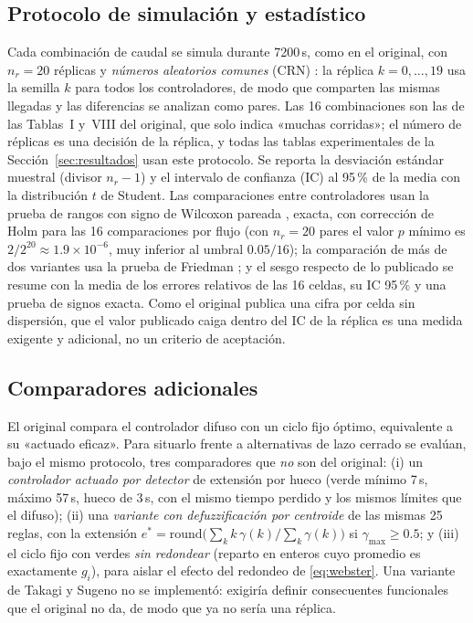 \documentclass[journal]{IEEEtran}
\begin{document}
\subsection{Protocolo de simulación y estadístico}
\label{sec:protocolo}
Cada combinación de caudal se simula durante 7200\,s, como en el original, con $n_r=20$ réplicas y \emph{números aleatorios comunes} (CRN) \cite{Law2015}: la réplica $k=0,\dots,19$ usa la semilla $k$ para todos los controladores, de modo que comparten las mismas llegadas y las diferencias se analizan como pares. Las 16 combinaciones son las de las Tablas~I y~VIII del original, que solo indica «muchas corridas»; el número de réplicas es una decisión de la réplica, y todas las tablas experimentales de la Sección~\ref{sec:resultados} usan este protocolo. Se reporta la desviación estándar muestral (divisor $n_r-1$) y el intervalo de confianza (IC) al 95\,\% de la media con la distribución $t$ de Student. Las comparaciones entre controladores usan la prueba de rangos con signo de Wilcoxon pareada \cite{Wilcoxon1945}, exacta, con corrección de Holm \cite{Holm1979} para las 16 comparaciones por flujo (con $n_r=20$ pares el valor $p$ mínimo es $2/2^{20}\approx1.9\times10^{-6}$, muy inferior al umbral $0.05/16$); la comparación de más de dos variantes usa la prueba de Friedman \cite{Friedman1937}; y el sesgo respecto de lo publicado se resume con la media de los errores relativos de las 16 celdas, su IC 95\,\% y una prueba de signos exacta. Como el original publica una cifra por celda sin dispersión, que el valor publicado caiga dentro del IC de la réplica es una medida exigente y adicional, no un criterio de aceptación.

\subsection{Comparadores adicionales}
\label{sec:comparadores}
El original compara el controlador difuso con un ciclo fijo óptimo, equivalente a su «actuado eficaz». Para situarlo frente a alternativas de lazo cerrado se evalúan, bajo el mismo protocolo, tres comparadores que \emph{no} son del original: (i) un \emph{controlador actuado por detector} de extensión por hueco (verde mínimo 7\,s, máximo 57\,s, hueco de 3\,s, con el mismo tiempo perdido y los mismos límites que el difuso); (ii) una \emph{variante con defuzzificación por centroide} de las mismas 25 reglas, con la extensión $e^*=\mathrm{round}\bigl(\sum_k k\,\gamma(k)/\sum_k \gamma(k)\bigr)$ si $\gamma_{\max}\ge0.5$; y (iii) el ciclo fijo con verdes \emph{sin redondear} (reparto en enteros cuyo promedio es exactamente $g_i$), para aislar el efecto del redondeo de \eqref{eq:webster}. Una variante de Takagi y Sugeno \cite{TakagiSugeno1985} no se implementó: exigiría definir consecuentes funcionales que el original no da, de modo que ya no sería una réplica.
\end{document}
